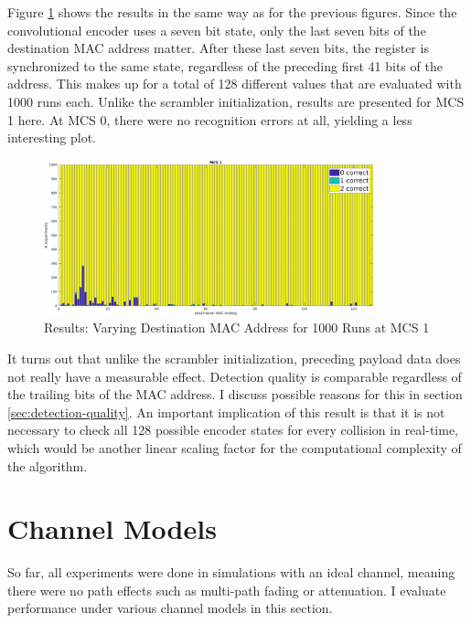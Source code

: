 Figure \ref{fig:vary_dest} shows the results in the same way as for the previous figures. Since the convolutional encoder uses a seven bit state, only the last seven bits of the destination \gls{MAC} address matter. After these last seven bits, the register is synchronized to the same state, regardless of the preceding first 41 bits of the address. This makes up for a total of 128 different values that are evaluated with 1000 runs each. Unlike the scrambler initialization, results are presented for \gls{MCS} 1 here. At \gls{MCS} 0, there were no recognition errors at all, yielding a less interesting plot.

\begin{figure}[H]
	\centering
	\includegraphics[height=4.5cm]{gfx/plots/destination}
	\caption[Results: Varying Destination \gls{MAC} Address for 1000 Runs]{Results: Varying Destination \gls{MAC} Address for 1000 Runs at MCS 1}
	\label{fig:vary_dest}
\end{figure}

It turns out that unlike the scrambler initialization, preceding payload data does not really have a measurable effect. Detection quality is comparable regardless of the trailing bits of the \gls{MAC} address. I discuss possible reasons for this in section \ref{sec:detection-quality}. An important implication of this result is that it is not necessary to check all 128 possible encoder states for every collision in real-time, which would be another linear scaling factor for the computational complexity of the algorithm.



\section{Channel Models}

So far, all experiments were done in simulations with an ideal channel, meaning there were no path effects such as multi-path fading or attenuation. I evaluate performance under various channel models in this section.\\

